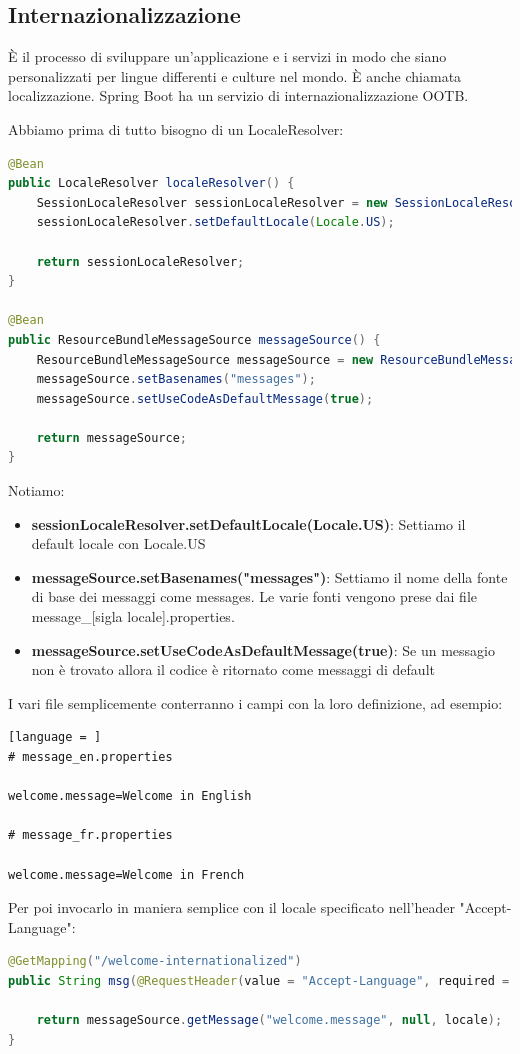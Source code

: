 \documentclass[11pt,a4paper]{book}
\begin{document}
\subsection{Internazionalizzazione}
È il processo di sviluppare un'applicazione e i servizi in modo che siano personalizzati per lingue differenti e culture nel mondo. È anche chiamata localizzazione. Spring Boot ha un servizio di internazionalizzazione OOTB.

Abbiamo prima di tutto bisogno di un LocaleResolver:
\begin{lstlisting}[language = Java]
@Bean
public LocaleResolver localeResolver() {
	SessionLocaleResolver sessionLocaleResolver = new SessionLocaleResolver();
	sessionLocaleResolver.setDefaultLocale(Locale.US);
	
	return sessionLocaleResolver;
}

@Bean
public ResourceBundleMessageSource messageSource() {
	ResourceBundleMessageSource messageSource = new ResourceBundleMessageSource();
	messageSource.setBasenames("messages");
	messageSource.setUseCodeAsDefaultMessage(true);
	
	return messageSource;
}
\end{lstlisting}
Notiamo:
\begin{itemize}
	\item \textbf{sessionLocaleResolver.setDefaultLocale(Locale.US)}: Settiamo il default locale con Locale.US
	\item \textbf{messageSource.setBasenames("messages")}: Settiamo il nome della fonte di base dei messaggi come messages. Le varie fonti vengono prese dai file message\_[sigla locale].properties.
	\item \textbf{messageSource.setUseCodeAsDefaultMessage(true)}: Se un messagio non è trovato allora il codice è ritornato come messaggi di default
\end{itemize}

I vari file semplicemente conterranno i campi con la loro definizione, ad esempio:
\begin{lstlisting}[language = ]
# message_en.properties

welcome.message=Welcome in English

# message_fr.properties

welcome.message=Welcome in French
\end{lstlisting}

Per poi invocarlo in maniera semplice con il locale specificato nell'header "Accept-Language":
\begin{lstlisting}[language = Java]
@GetMapping("/welcome-internationalized")
public String msg(@RequestHeader(value = "Accept-Language", required = false) Locale locale) {

	return messageSource.getMessage("welcome.message", null, locale);
}
\end{lstlisting}
\end{document}
